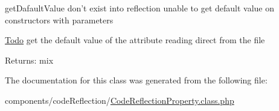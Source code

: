 getDafaultValue don't exist into reflection  unable to get default value on constructors with parameters \begin{Desc}
\item[\hyperlink{todo__todo000003}{Todo}]get the default value of the attribute reading direct from the file \end{Desc}
\begin{Desc}
\item[Returns:]mix \end{Desc}


The documentation for this class was generated from the following file:\begin{CompactItemize}
\item 
components/codeReflection/\hyperlink{_code_reflection_property_8class_8php}{CodeReflectionProperty.class.php}\end{CompactItemize}
